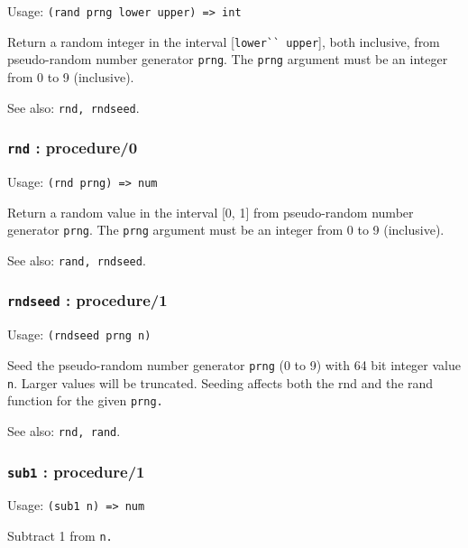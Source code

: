\documentclass[
]{article}
\newcommand{\passthrough}[1]{#1}
\begin{document}
Usage: \passthrough{\lstinline!(rand prng lower upper) => int!}

Return a random integer in the interval
{[}\passthrough{\lstinline!lower`` upper!}{]}, both inclusive, from
pseudo-random number generator \passthrough{\lstinline!prng!}. The
\passthrough{\lstinline!prng!} argument must be an integer from 0 to 9
(inclusive).

See also: \passthrough{\lstinline!rnd, rndseed!}.

\hypertarget{rnd-procedure0}{%
\subsubsection{\texorpdfstring{\texttt{rnd} :
procedure/0}{rnd : procedure/0}}\label{rnd-procedure0}}

Usage: \passthrough{\lstinline!(rnd prng) => num!}

Return a random value in the interval {[}0, 1{]} from pseudo-random
number generator \passthrough{\lstinline!prng!}. The
\passthrough{\lstinline!prng!} argument must be an integer from 0 to 9
(inclusive).

See also: \passthrough{\lstinline!rand, rndseed!}.

\hypertarget{rndseed-procedure1}{%
\subsubsection{\texorpdfstring{\texttt{rndseed} :
procedure/1}{rndseed : procedure/1}}\label{rndseed-procedure1}}

Usage: \passthrough{\lstinline!(rndseed prng n)!}

Seed the pseudo-random number generator \passthrough{\lstinline!prng!}
(0 to 9) with 64 bit integer value \passthrough{\lstinline!n!}. Larger
values will be truncated. Seeding affects both the rnd and the rand
function for the given \passthrough{\lstinline!prng.!}

See also: \passthrough{\lstinline!rnd, rand!}.

\hypertarget{sub1-procedure1}{%
\subsubsection{\texorpdfstring{\texttt{sub1} :
procedure/1}{sub1 : procedure/1}}\label{sub1-procedure1}}

Usage: \passthrough{\lstinline!(sub1 n) => num!}

Subtract 1 from \passthrough{\lstinline!n.!}
\end{document}

